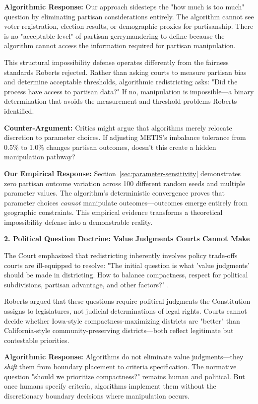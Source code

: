\textbf{Algorithmic Response:} Our approach sidesteps the "how much is too much" question by eliminating partisan considerations entirely. The algorithm cannot see voter registration, election results, or demographic proxies for partisanship. There is no "acceptable level" of partisan gerrymandering to define because the algorithm cannot access the information required for partisan manipulation.

This structural impossibility defense operates differently from the fairness standards Roberts rejected. Rather than asking courts to measure partisan bias and determine acceptable thresholds, algorithmic redistricting asks: "Did the process have access to partisan data?" If no, manipulation is impossible—a binary determination that avoids the measurement and threshold problems Roberts identified.

\textbf{Counter-Argument:} Critics might argue that algorithms merely relocate discretion to parameter choices. If adjusting METIS's imbalance tolerance from 0.5\% to 1.0\% changes partisan outcomes, doesn't this create a hidden manipulation pathway?

\textbf{Our Empirical Response:} Section~\ref{sec:parameter-sensitivity} demonstrates zero partisan outcome variation across 100 different random seeds and multiple parameter values. The algorithm's deterministic convergence proves that parameter choices \textit{cannot} manipulate outcomes—outcomes emerge entirely from geographic constraints. This empirical evidence transforms a theoretical impossibility defense into a demonstrable reality.

\textbf{2. Political Question Doctrine: Value Judgments Courts Cannot Make}

The Court emphasized that redistricting inherently involves policy trade-offs courts are ill-equipped to resolve: "The initial question is what 'value judgments' should be made in districting. How to balance compactness, respect for political subdivisions, partisan advantage, and other factors?" \citep{rucho2019}.

Roberts argued that these questions require political judgments the Constitution assigns to legislatures, not judicial determinations of legal rights. Courts cannot decide whether Iowa-style compactness-maximizing districts are "better" than California-style community-preserving districts—both reflect legitimate but contestable priorities.

\textbf{Algorithmic Response:} Algorithms do not eliminate value judgments—they \textit{shift} them from boundary placement to criteria specification. The normative question "should we prioritize compactness?" remains human and political. But once humans specify criteria, algorithms implement them without the discretionary boundary decisions where manipulation occurs.

